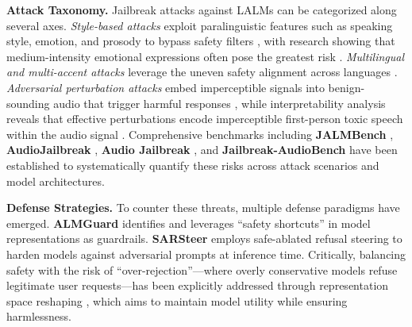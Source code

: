 \textbf{Attack Taxonomy.} Jailbreak attacks against LALMs can be categorized along several axes. \textit{Style-based attacks} exploit paralinguistic features such as speaking style, emotion, and prosody to bypass safety filters \cite{li2025stylebreak}, with research showing that medium-intensity emotional expressions often pose the greatest risk \cite{feng2025investigating}. \textit{Multilingual and multi-accent attacks} leverage the uneven safety alignment across languages \cite{roh2025multilingual}. \textit{Adversarial perturbation attacks} embed imperceptible signals into benign-sounding audio that trigger harmful responses \cite{kim2025good}, while interpretability analysis reveals that effective perturbations encode imperceptible first-person toxic speech within the audio signal \cite{gupta2025bad}. Comprehensive benchmarks including \textbf{JALMBench} \cite{peng2025jalmbench}, \textbf{AudioJailbreak} \cite{chen2025audiojailbreak}, \textbf{Audio Jailbreak} \cite{song2025audio}, and \textbf{Jailbreak-AudioBench} \cite{cheng2025jailbreak} have been established to systematically quantify these risks across attack scenarios and model architectures.

\textbf{Defense Strategies.} To counter these threats, multiple defense paradigms have emerged. \textbf{ALMGuard} \cite{jin2025almguard} identifies and leverages ``safety shortcuts'' in model representations as guardrails. \textbf{SARSteer} \cite{lin2025sarsteer} employs safe-ablated refusal steering to harden models against adversarial prompts at inference time. Critically, balancing safety with the risk of ``over-rejection''---where overly conservative models refuse legitimate user requests---has been explicitly addressed through representation space reshaping \cite{yang2025reshaping}, which aims to maintain model utility while ensuring harmlessness.